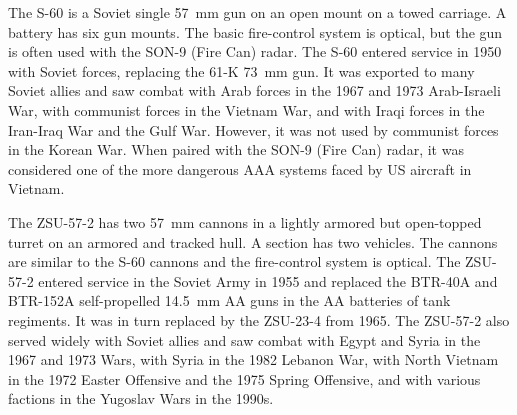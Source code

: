 
The S-60 is a Soviet single 57~mm gun on an open mount on a towed carriage.
A battery has six gun mounts.
The basic fire-control system is optical, but the gun is often used with the SON-9 (Fire Can) radar.
The S-60 entered service in 1950 with Soviet forces, replacing the 61-K 73~mm gun.
It was exported to many Soviet allies and saw combat with Arab forces in the 1967 and 1973 Arab-Israeli War, with communist forces in the Vietnam War, and with Iraqi forces in the Iran-Iraq War and the Gulf War. However, it was not used by communist forces in the Korean War. When paired with the SON-9 (Fire Can) radar, it was considered one of the more dangerous AAA systems faced by US aircraft in Vietnam.%


The ZSU-57-2 has two 57~mm cannons in a lightly armored but open-topped turret on an armored and tracked hull.
A section has two vehicles.
The cannons are similar to the S-60 cannons and the fire-control system is optical.
The ZSU-57-2 entered service in the Soviet Army in 1955 and replaced the BTR-40A and BTR-152A self-propelled 14.5~mm AA guns in the AA batteries of tank regiments. It was in turn replaced by the ZSU-23-4 from 1965. The ZSU-57-2 also served widely with Soviet allies and saw combat with Egypt and Syria in the 1967 and 1973 Wars, with Syria in the 1982 Lebanon War, with North Vietnam in the 1972 Easter Offensive and the 1975 Spring Offensive, and with various factions in the Yugoslav Wars in the 1990s.%

